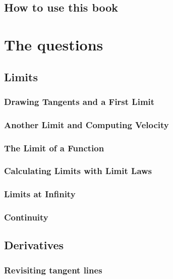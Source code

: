 \documentclass[12pt,letterpaper]{book}
\begin{document}
\frontmatter

\chapter{How to use this book}


\tableofcontents

\mainmatter


\part{The questions}

\chapter{Limits}
\section{Drawing Tangents and a First Limit}

\section{Another Limit and Computing Velocity}

\section{The Limit of a Function}

\section{Calculating Limits with Limit Laws}

\section{Limits at Infinity}

\section{Continuity}


\chapter{Derivatives}
\section{Revisiting tangent lines}

\end{document}
